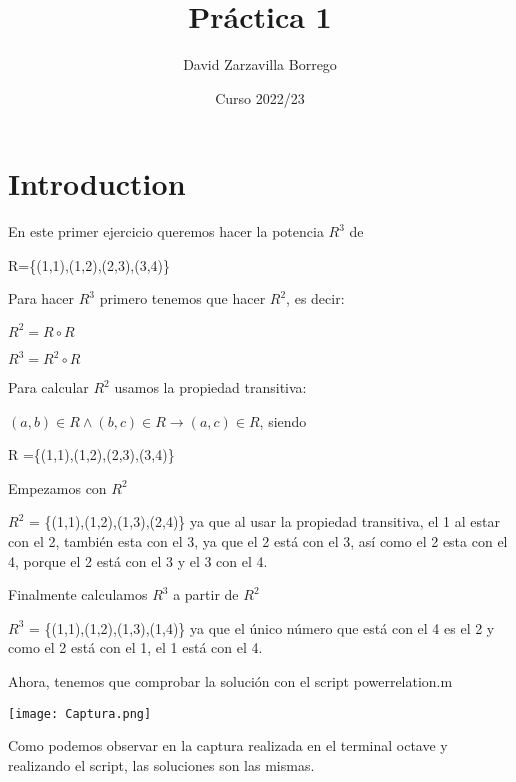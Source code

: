 \documentclass[12pt]{article}
\title{Práctica 1}
\author{David Zarzavilla Borrego}
\date{Curso 2022/23}
\begin{document}
\maketitle

\section{Introduction}
En este primer ejercicio queremos hacer la potencia $R^3$ de 

R=\{(1,1),(1,2),(2,3),(3,4)\}

\vspace{5mm}
Para hacer $R^3$ primero tenemos que hacer $R^2$, es decir:

$R^2=R \circ R$

$R^3 = R^2 \circ R$

Para calcular $R^2$ usamos la propiedad transitiva:

$(a,b) \in R \wedge (b,c) \in R \rightarrow (a,c) \in R$, siendo 

R =\{(1,1),(1,2),(2,3),(3,4)\}

\vspace{5mm}
Empezamos con $R^2$

$R^2$ = \{(1,1),(1,2),(1,3),(2,4)\} ya que al usar la propiedad transitiva, el 1 al estar con el 2, también esta con el 3, ya que el 2 está con el 3, así como el 2 esta con el 4, porque el 2 está con el 3 y el 3 con el 4.

\vspace{5mm}
Finalmente calculamos $R^3$ a partir de $R^2$

$R^3$ = \{(1,1),(1,2),(1,3),(1,4)\} ya que el único número que está con el 4 es el 2 y como el 2 está con el 1, el 1 está con el 4.

\newpage
Ahora, tenemos que comprobar la solución con el script powerrelation.m

\vspace{5mm}

\texttt{[image: Captura.png]}

\vspace{5mm}
Como podemos observar en la captura realizada en el terminal octave y realizando el script, las soluciones son las mismas.
\end{document}

